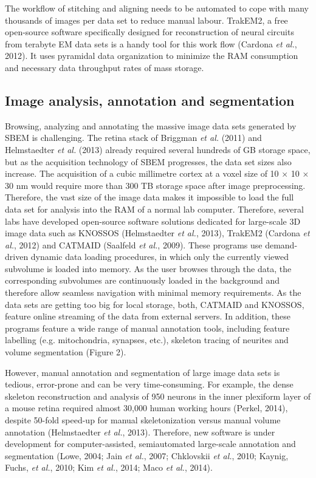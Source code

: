 \documentclass{article}
\begin{document}
The workflow of stitching and aligning needs to be automated to cope with many thousands of images per data set to reduce manual labour. TrakEM2, a free open-source software specifically designed for reconstruction of neural circuits from terabyte EM data sets is a handy tool for this work flow (Cardona \emph{et al.}, 2012). It uses pyramidal data organization to minimize the RAM consumption and necessary data throughput rates of mass storage.

\subsection*{Image analysis, annotation and segmentation}

Browsing, analyzing and annotating the massive image data sets generated by SBEM is challenging. The retina stack of Briggman \emph{et al.} (2011) and Helmstaedter \emph{et al.} (2013) already required several hundreds of GB storage space, but as the acquisition technology of SBEM progresses, the data set sizes also increase. The acquisition of a cubic millimetre cortex at a voxel size of 10 × 10 × 30 nm would require more than 300 TB storage space after image preprocessing. Therefore, the vast size of the image data makes it impossible to load the full data set for analysis into the RAM of a normal lab computer. Therefore, several labs have developed open-source software solutions dedicated for large-scale 3D image data such as KNOSSOS (Helmstaedter \emph{et al.}, 2013), TrakEM2 (Cardona \emph{et al.}, 2012) and CATMAID (Saalfeld \emph{et al.}, 2009). These programs use demand-driven dynamic data loading procedures, in which only the currently viewed subvolume is loaded into memory. As the user browses through the data, the corresponding subvolumes are continuously loaded in the background and therefore allow seamless navigation with minimal memory requirements. As the data sets are getting too big for local storage, both, CATMAID and KNOSSOS, feature online streaming of the data from external servers. In addition, these programs feature a wide range of manual annotation tools, including feature labelling (e.g. mitochondria, synapses, etc.), skeleton tracing of neurites and volume segmentation (Figure 2).

However, manual annotation and segmentation of large image data sets is tedious, error-prone and can be very time-consuming. For example, the dense skeleton reconstruction and analysis of 950 neurons in the inner plexiform layer of a mouse retina required almost 30,000 human working hours (Perkel, 2014), despite 50-fold speed-up for manual skeletonization versus manual volume annotation (Helmstaedter \emph{et al.}, 2013). Therefore, new software is under development for computer-assisted, semiautomated large-scale annotation and segmentation (Lowe, 2004; Jain \emph{et al.}, 2007; Chklovskii \emph{et al.}, 2010; Kaynig, Fuchs, \emph{et al.}, 2010; Kim \emph{et al.}, 2014; Maco \emph{et al.}, 2014).
\end{document}
